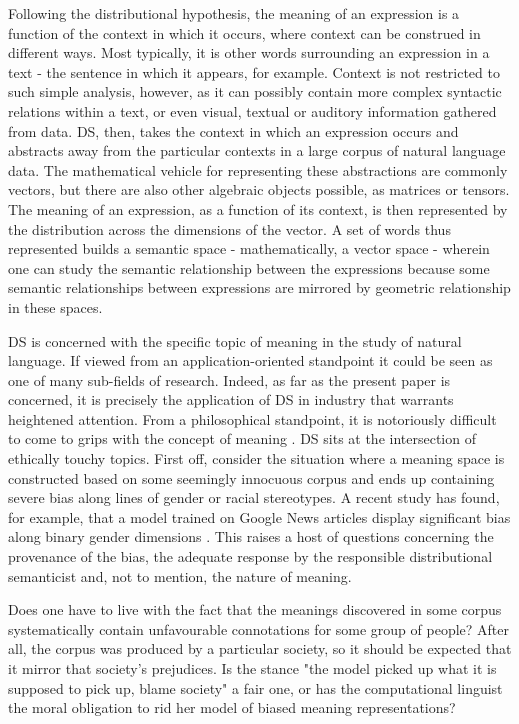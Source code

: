 \documentclass{article}
\begin{document}
Following the distributional hypothesis, the meaning of an expression is a function of the context in which it occurs, where context can be construed in different ways. Most typically, it is other words surrounding an expression in a text - the sentence in which it appears, for example. Context is not restricted to such simple analysis, however, as it can possibly contain more complex syntactic relations within a text, or even visual, textual or auditory information gathered from data.
\cite{boleda2016formal}
DS, then, takes the context in which an expression occurs and abstracts away from the particular contexts in a large corpus of natural language data. The mathematical vehicle for representing these abstractions are commonly vectors, but there are also other algebraic objects possible, as matrices or tensors. The meaning of an expression, as a function of its context, is then represented by the distribution across the dimensions of the vector. A set of words thus represented builds a semantic space - mathematically, a vector space - wherein one can study the semantic relationship between the expressions because some semantic relationships between expressions are mirrored by geometric relationship in these spaces.

DS is concerned with the specific topic of meaning in the study of natural language. If viewed from an application-oriented standpoint it could be seen as one of many sub-fields of  research. Indeed, as far as the present paper is concerned, it is precisely the application of DS in industry that warrants heightened attention.
From a philosophical standpoint, it is notoriously difficult to come to grips with the concept of meaning .
DS sits at the intersection of ethically touchy topics. 
First off, consider the situation where a meaning space is constructed based on some seemingly innocuous corpus and ends up containing severe bias along lines of gender or racial stereotypes. A recent study has found, for example, that a model trained on Google News articles display significant bias along binary gender dimensions \cite{bolukbasi2016man}. This raises a host of questions concerning the provenance of the bias, the adequate response by the responsible distributional semanticist and, not to mention, the nature of meaning.

Does one have to live with the fact that the meanings discovered in some corpus systematically contain unfavourable connotations for some group of people? After all, the corpus was produced by a particular society, so it should be expected that it mirror that society's prejudices. Is the stance "the model picked up what it is supposed to pick up, blame society" a fair one, or has the computational linguist the moral obligation to rid her model of biased meaning representations?
\end{document}
